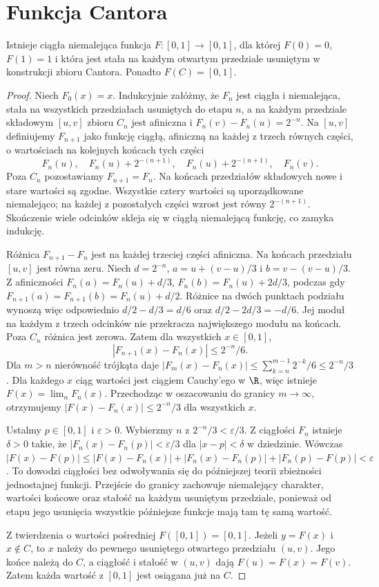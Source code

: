 \section{Funkcja Cantora}
\begin{twierdzenie}
\label{ma1:thm:cantor-function}
Istnieje ciągła niemalejąca funkcja $F:[0,1]\to[0,1]$, dla której $F(0)=0$, $F(1)=1$ i która jest stała na każdym otwartym przedziale usuniętym w konstrukcji zbioru Cantora. Ponadto $F(C)=[0,1]$.
\end{twierdzenie}
\begin{proof}
Niech $F_0(x)=x$. Indukcyjnie załóżmy, że $F_n$ jest ciągła i niemalejąca, stała na wszystkich przedziałach usuniętych do etapu $n$, a na każdym przedziale składowym $[u,v]$ zbioru $C_n$ jest afiniczna i $F_n(v)-F_n(u)=2^{-n}$. Na $[u,v]$ definiujemy $F_{n+1}$ jako funkcję ciągłą, afiniczną na każdej z trzech równych części, o wartościach na kolejnych końcach tych części
\[
 F_n(u),\quad F_n(u)+2^{-(n+1)},\quad
 F_n(u)+2^{-(n+1)},\quad F_n(v).
\]
Poza $C_n$ pozostawiamy $F_{n+1}=F_n$. Na końcach przedziałów składowych nowe i stare wartości są zgodne. Wszystkie cztery wartości są uporządkowane niemalejąco; na każdej z pozostałych części wzrost jest równy $2^{-(n+1)}$. Skończenie wiele odcinków skleja się w ciągłą niemalejącą funkcję, co zamyka indukcję.

Różnica $F_{n+1}-F_n$ jest na każdej trzeciej części afiniczna. Na końcach przedziału $[u,v]$ jest równa zeru. Niech $d=2^{-n}$, $a=u+(v-u)/3$ i $b=v-(v-u)/3$. Z afiniczności $F_n(a)=F_n(u)+d/3$, $F_n(b)=F_n(u)+2d/3$, podczas gdy $F_{n+1}(a)=F_{n+1}(b)=F_n(u)+d/2$. Różnice na dwóch punktach podziału wynoszą więc odpowiednio $d/2-d/3=d/6$ oraz $d/2-2d/3=-d/6$. Jej moduł na każdym z trzech odcinków nie przekracza największego modułu na końcach. Poza $C_n$ różnica jest zerowa. Zatem dla wszystkich $x\in[0,1]$,
\[
 |F_{n+1}(x)-F_n(x)|\le 2^{-n}/6.
\]
Dla $m>n$ nierówność trójkąta daje $|F_m(x)-F_n(x)|\le\sum_{k=n}^{m-1}2^{-k}/6\le 2^{-n}/3$. Dla każdego $x$ ciąg wartości jest ciągiem Cauchy'ego w $\R$, więc istnieje $F(x)=\lim_n F_n(x)$. Przechodząc w oszacowaniu do granicy $m\to\infty$, otrzymujemy $|F(x)-F_n(x)|\le2^{-n}/3$ dla wszystkich $x$.

Ustalmy $p\in[0,1]$ i $\varepsilon>0$. Wybierzmy $n$ z $2^{-n}/3<\varepsilon/3$. Z ciągłości $F_n$ istnieje $\delta>0$ takie, że $|F_n(x)-F_n(p)|<\varepsilon/3$ dla $|x-p|<\delta$ w dziedzinie. Wówczas
$|F(x)-F(p)|\le |F(x)-F_n(x)|+|F_n(x)-F_n(p)|+|F_n(p)-F(p)|<\varepsilon$.
To dowodzi ciągłości bez odwoływania się do późniejszej teorii zbieżności jednostajnej funkcji. Przejście do granicy zachowuje niemalejący charakter, wartości końcowe oraz stałość na każdym usuniętym przedziale, ponieważ od etapu jego usunięcia wszystkie późniejsze funkcje mają tam tę samą wartość.

Z twierdzenia o wartości pośredniej $F([0,1])=[0,1]$. Jeżeli $y=F(x)$ i $x\notin C$, to $x$ należy do pewnego usuniętego otwartego przedziału $(u,v)$. Jego końce należą do $C$, a ciągłość i stałość w $(u,v)$ dają $F(u)=F(x)=F(v)$. Zatem każda wartość z $[0,1]$ jest osiągana już na $C$.
\end{proof}

